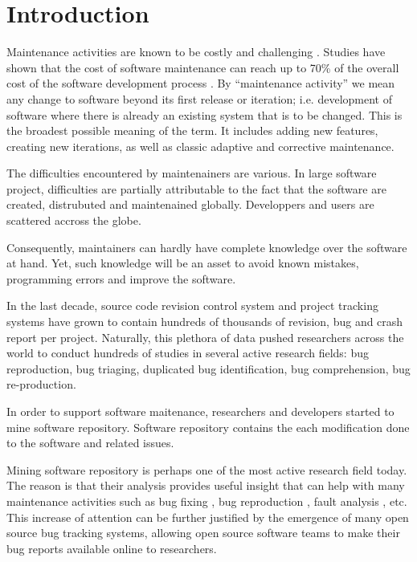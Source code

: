 
\setcounter{page}{1}

\chapter{Introduction}

Maintenance activities are known to be costly and challenging \cite{Pressman2005}. Studies have shown that the cost of software maintenance can reach up to 70\% of the overall cost of the software development process \cite{HealthSocial2002}.
By ``maintenance activity'' we mean any change to software beyond its first release or iteration; i.e. development of software where there is already an existing system that is to be changed.
This is the broadest possible meaning of the term.
It includes adding new features, creating new iterations, as well as classic adaptive and corrective maintenance.

The difficulties encountered by maintenainers are various.
In large software project, difficulties are partially attributable to the fact that the software are created, distrubuted and maintenained globally.
Developpers and users are scattered accross the globe.

Consequently, maintainers can hardly have complete knowledge over the software at hand.
Yet, such knowledge will be an asset to avoid known mistakes, programming errors and improve the software.

In the last decade, source code revision control system and project tracking systems have grown to contain hundreds of thousands of revision, bug and crash report per project.
Naturally, this plethora of data pushed researchers across the world to conduct hundreds of studies in several active research fields: bug reproduction, bug triaging, duplicated bug identification, bug comprehension, bug re-production.

In order to support software maitenance, researchers and developers started to mine software repository.
Software repository contains the each modification done to the software and related issues.

Mining software repository is perhaps one of the most active research field today.
The reason is that their analysis provides useful insight that can help with many maintenance activities such as bug fixing \cite{Weiss2007,Saha2014}, bug reproduction \cite{Artzi2008,Jin2012,Chen2013}, fault analysis \cite{Jiang2012,Jin2013}, etc.
This increase of attention can be further justified by the emergence of many open source bug tracking systems, allowing open source software teams to make their bug reports available online to researchers.

